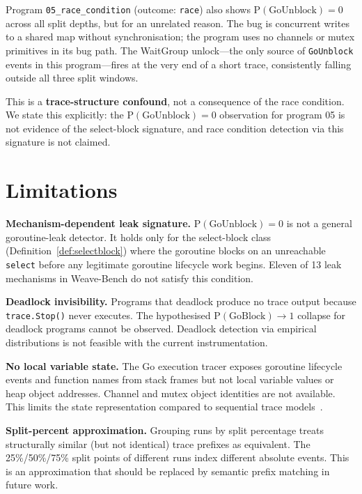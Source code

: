 \documentclass[sigconf,review,anonymous]{acmart}
\begin{document}
Program \texttt{05\_race\_condition} (outcome: \texttt{race}) also shows
$\mathrm{P(GoUnblock)=0}$ across all split depths, but for an unrelated reason.
The bug is concurrent writes to a shared map without synchronisation; the program
uses no channels or mutex primitives in its bug path. The WaitGroup unlock---the
only source of \texttt{GoUnblock} events in this program---fires at the very end
of a short trace, consistently falling outside all three split windows.

This is a \textbf{trace-structure confound}, not a consequence of the race
condition. We state this explicitly: the $\mathrm{P(GoUnblock)=0}$ observation
for program 05 is not evidence of the select-block signature, and race condition
detection via this signature is not claimed.

\section{Limitations}
\label{sec:limitations}

\textbf{Mechanism-dependent leak signature.} $\mathrm{P(GoUnblock)=0}$ is not a
general goroutine-leak detector. It holds only for the select-block class
(Definition~\ref{def:selectblock}) where the goroutine blocks on an unreachable
\texttt{select} before any legitimate goroutine lifecycle work begins. Eleven of
13 leak mechanisms in Weave-Bench do not satisfy this condition.

\textbf{Deadlock invisibility.} Programs that deadlock produce no trace output
because \texttt{trace.Stop()} never executes. The hypothesised
$\mathrm{P(GoBlock)} \to 1$ collapse for deadlock programs cannot be observed.
Deadlock detection via empirical distributions is not feasible with the current
instrumentation.

\textbf{No local variable state.} The Go execution tracer exposes goroutine
lifecycle events and function names from stack frames but not local variable
values or heap object addresses. Channel and mutex object identities are not
available. This limits the state representation compared to sequential trace
models~\cite{meta2025cwm}.

\textbf{Split-percent approximation.} Grouping runs by split percentage treats
structurally similar (but not identical) trace prefixes as equivalent. The
25\%/50\%/75\% split points of different runs index different absolute events.
This is an approximation that should be replaced by semantic prefix matching
in future work.
\end{document}
